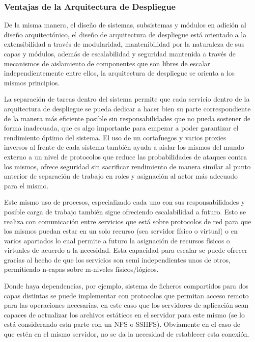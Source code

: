 \subsubsection{Ventajas de la Arquitectura de Despliegue}
De la misma manera, el diseño de sistemas, subsistemas y módulos en adición al diseño arquitectónico, el diseño de arquitectura de despliegue está orientado a la extensibilidad a través de modularidad, mantenibilidad por la naturaleza de sus capas y módulos, además de escalabilidad y seguridad mantenida a través de mecanismos de aislamiento de componentes que son libres de escalar independientemente entre ellos, la arquitectura de despliegue se orienta a los mismos principios.

La separación de tareas dentro del sistema permite que cada servicio dentro de la arquitectura de despliegue se pueda dedicar a hacer bien su parte correspondiente de la manera más eficiente posible sin responsabilidades que no pueda sostener de forma inadecuada, que es algo importante para empezar a poder garantizar el rendimiento óptimo del sistema. El uso de un cortafuegos y varios proxies inversos al frente de cada sistema también ayuda a aislar los mismos del mundo externo a un nivel de protocolos que reduce las probabilidades de ataques contra los mismos, ofrece seguridad sin sacrificar rendimiento de manera similar al punto anterior de separación de trabajo en roles y asignación al actor más adecuado para el mismo.

Este mismo uso de procesos, especializado cada uno con sus responsabilidades y posible carga de trabajo también sigue ofreciendo escalabilidad a futuro. Esto se realiza con comunicación entre servicios que está sobre protocolos de red para que los mismos puedan estar en un solo recurso (sea servidor físico o virtual) o en varios apartados lo cual permite a futuro la asignación de recursos físicos o virtuales de acuerdo a la necesidad. Esta capacidad para escalar se puede ofrecer gracias al hecho de que los servicios son semi independientes unos de otros, permitiendo n-capas sobre m-niveles físicos/lógicos.

Donde haya dependencias, por ejemplo, sistema de ficheros compartidos para dos capas distintas se puede implementar con protocolos que permitan acceso remoto para las operaciones necesarias, en este caso que los servidores de aplicación sean capaces de actualizar los archivos estáticos en el servidor para este mismo (se lo está considerando esta parte con un NFS o SSHFS). Obviamente en el caso de que estén en el mismo servidor, no se da la necesidad de establecer esta conexión.


